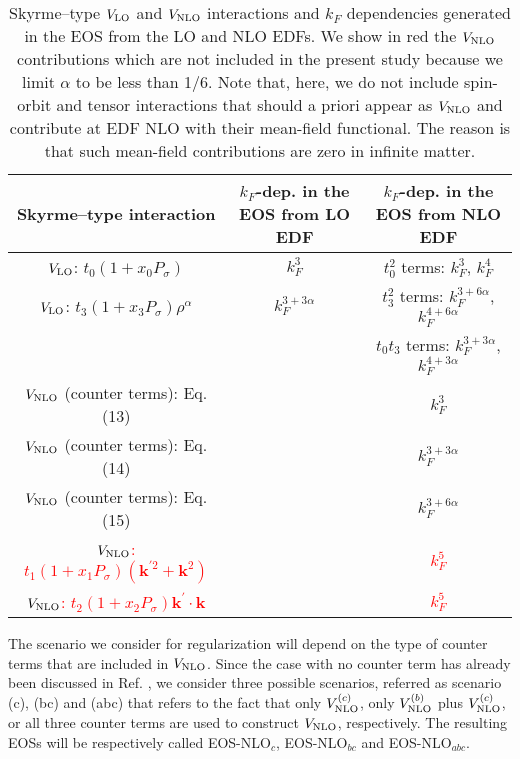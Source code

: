 \documentclass[aps,11pt,prc,preprint,superscriptaddress,nofootinbib]{revtex4}
\begin{document}
\begin{table}[htbp]
\begin{center}
\begin{tabular}{|c|c|c|}
\hline\hline
Skyrme--type interaction & $k_F$-dep. in the EOS from LO EDF & $k_F$-dep. in the EOS from NLO EDF  \\ \hline
$V_{\rm LO}$: $t_0(1+x_0P_{\sigma})$ & $k_F^3$ & $t_0^2$ terms: $k_F^3$, $k_F^4$ \\ \hline
$V_{\rm LO}$: $t_3(1+x_3P_{\sigma})\rho^{\alpha}$ & $k_F^{3+3\alpha}$ & $t_3^2$ terms: $k_F^{3+6\alpha}$, $k_F^{4+6\alpha}$ \\ \hline
                                         &                   & $t_0t_3$ terms:  $k_F^{3+3\alpha}$, $k_F^{4+3\alpha}$ \\ \hline
$V_{\rm NLO}$ (counter terms): Eq. (13)                           &                   &  $k_F^3$ \\ \hline
$V_{\rm NLO}$ (counter terms): Eq. (14)                           &                   &  $k_F^{3+3\alpha}$ \\ \hline
$V_{\rm NLO}$ (counter terms): Eq. (15)                           &                   & $k_F^{3+6\alpha}$ \\ \hline
\textcolor{red}{$V_{\rm NLO}$: $t_1(1+x_1P_{\sigma})(\mathbf{k%
}^{\prime 2}+\mathbf{k}^{2})$} &  & \textcolor{red}{$k_F^5$} \\ \hline
\textcolor{red}{$V_{\rm NLO}$: $t_2(1+x_2P_{\sigma})\mathbf{k}^{\prime
}\cdot \mathbf{k}$} &    & \textcolor{red}{$k_F^5$} \\ \hline
\end{tabular}
\end{center}
\caption{Skyrme--type $V_{\rm LO}$ and $V_{\rm NLO}$ interactions and $k_F$ dependencies generated in the EOS from the LO and NLO EDFs. We show in red the $V_{\rm NLO}$ contributions which are not included in the present study because we limit $\alpha$ to be less than 1/6. Note that, here, we do not include spin-orbit and tensor interactions  
that should a priori appear as $V_{\rm NLO}$ and contribute at EDF NLO with their mean-field functional. The reason is that such mean-field contributions are zero in infinite matter.}
\label{list}
\end{table}


The scenario we consider for regularization 
will depend on the type of counter terms that are included in $V_{\rm NLO}$. Since the case with no counter term has already been 
discussed in Ref. \cite{bira}, we consider three possible scenarios, referred as scenario (c), (bc) and (abc) that refers to the fact that 
only $V^{(c)}_{\rm NLO}$, only  $V^{(b)}_{\rm NLO}$ plus $V^{(c)}_{\rm NLO}$, or all three counter terms are used to construct $V_{\rm NLO}$, respectively. The resulting  
EOSs will be respectively called EOS-NLO${_c}$, EOS-NLO${_{bc}}$ and EOS-NLO${_{abc}}$.
 
\end{document}
